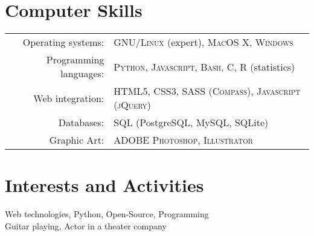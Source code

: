 \documentclass[a4paper,10pt]{article}
\begin{document}

\section{Computer Skills}
\begin{tabular}{rl}
Operating systems:& \textsc{GNU/Linux} (expert), \textsc{MacOS X},  \textsc{Windows}\\
Programming languages:& \textsc{Python}, \textsc{Javascript}, \textsc{Bash}, \textsc{C}, \textsc{R} (statistics) \\
Web integration:& \textsc{HTML5}, \textsc{CSS3}, \textsc{SASS} (\textsc{Compass}), \textsc{Javascript} (\textsc{jQuery})\\
Databases:& \textsc{SQL} (PostgreSQL, MySQL, SQLite) \\
Graphic Art:& \textsc{ADOBE Photoshop}, \textsc{Illustrator} \\
\end{tabular}

\section{Interests and Activities}
Web technologies, Python, Open-Source, Programming\\
Guitar playing, Actor in a theater company\\
\end{document}
